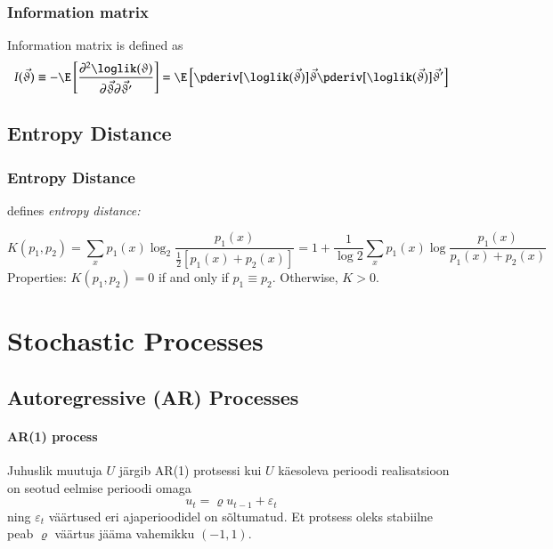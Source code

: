 \documentclass[a4paper]{article}
\numberwithin{equation}{subsection}
\begin{document}
\subsubsection{Information matrix}

Information matrix is defined as
\begin{equation}
  I(\vec{\vartheta})
  \equiv
  - \E \left[ 
    \frac{\partial^2 \loglik(\vartheta)}
    {\partial \vec{\vartheta} \partial \vec{\vartheta}'}
  \right]
  =
  \E \left[
    \pderiv[\loglik(\vec{\vartheta})]
    {\vec{\vartheta}}
    \pderiv[\loglik(\vec{\vartheta})]
    {\vec{\vartheta}'}
  \right]
\end{equation}

\subsection{Entropy Distance}
\label{sec:entropy_distance}

\subsubsection{Entropy Distance}
\label{sec:lin1991_entropy_distance}

\citet{lin1991} defines \emph{entropy distance:}

\begin{equation}
  K(p_{1},p_{2})
  =
  \sum_{x} p_{1}(x)
  \log_{2}
  \frac{p_{1}(x)}
  {\frac{1}{2}[p_{1}(x) + p_{2}(x)]}
  =
  1 + \frac{1}{\log 2}
  \sum_{x} p_{1}(x)
  \log
  \frac{p_{1}(x)}
  {p_{1}(x) + p_{2}(x)}
\end{equation}
Properties: $K(p_{1}, p_{2}) = 0$ if and only if $p_{1} \equiv
p_{2}$.  Otherwise, $K > 0$.

\newpage
\section{Stochastic Processes}

\subsection{Autoregressive (AR) Processes}

\paragraph{AR(1) process}

Juhuslik muutuja $U$ järgib AR(1) protsessi kui $U$ käesoleva perioodi
realisatsioon on seotud eelmise perioodi omaga
\begin{equation}
  u_t = \varrho u_{t-1} + \varepsilon_t
\end{equation}
ning $\varepsilon_t$ väärtused eri ajaperioodidel on sõltumatud.  Et
protsess oleks stabiilne peab $\varrho$ väärtus jääma vahemikku
$(-1, 1)$. 
\end{document}
